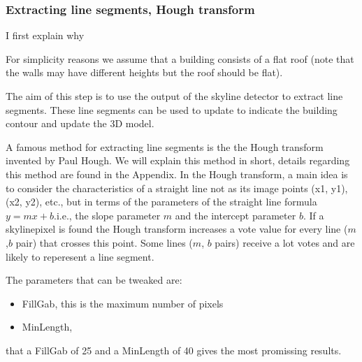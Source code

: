 \subsubsection{Extracting line segments, Hough transform} %
	I first explain why 


For simplicity reasons we assume that a building consists of a flat roof (note that the walls may have different heights but the roof should be flat).


	The aim of this step is to use the output of the skyline detector to extract line segments. These line segments can be used to update to indicate the building contour and update the 3D model.


	A famous method for extracting line segments is the the Hough transform invented by Paul Hough.
	We will explain this method in short, details regarding this method are found in the Appendix.
	In the Hough transform, a main idea is to consider the characteristics of a straight line not as its image points (x1, y1), (x2, y2), etc., but in terms of the parameters of the straight line formula $y = mx + b$.i.e., the slope parameter $m$ and the intercept parameter $b$.
	If a skylinepixel is found the Hough transform increases a vote value for every line ($m$,$b$ pair) that crosses this point.
	Some lines ($m$, $b$ pairs) receive a lot votes and are likely to reperesent a line segment.

	The parameters that can be tweaked are:
	\begin{itemize}
	\item FillGab, this is the maximum number of pixels %
	\item MinLength,
	\end{itemize}
	that a FillGab of 25 and a MinLength of 40 gives the most promissing results.





